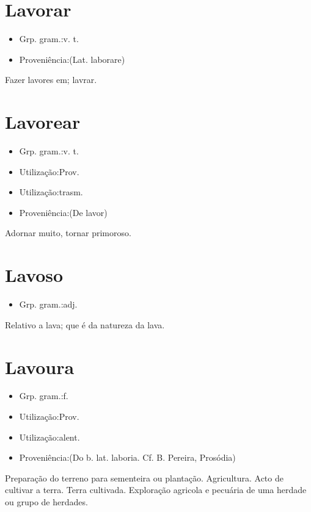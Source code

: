 \section{Lavorar}
\begin{itemize}
\item {Grp. gram.:v. t.}
\end{itemize}
\begin{itemize}
\item {Proveniência:(Lat. \textunderscore laborare\textunderscore )}
\end{itemize}
Fazer lavores em; lavrar.
\section{Lavorear}
\begin{itemize}
\item {Grp. gram.:v. t.}
\end{itemize}
\begin{itemize}
\item {Utilização:Prov.}
\end{itemize}
\begin{itemize}
\item {Utilização:trasm.}
\end{itemize}
\begin{itemize}
\item {Proveniência:(De \textunderscore lavor\textunderscore )}
\end{itemize}
Adornar muito, tornar primoroso.
\section{Lavoso}
\begin{itemize}
\item {Grp. gram.:adj.}
\end{itemize}
Relativo a lava; que é da natureza da lava.
\section{Lavoura}
\begin{itemize}
\item {Grp. gram.:f.}
\end{itemize}
\begin{itemize}
\item {Utilização:Prov.}
\end{itemize}
\begin{itemize}
\item {Utilização:alent.}
\end{itemize}
\begin{itemize}
\item {Proveniência:(Do b. lat. \textunderscore laboria\textunderscore . Cf. B. Pereira, \textunderscore Prosódia\textunderscore )}
\end{itemize}
Preparação do terreno para sementeira ou plantação.
Agricultura.
Acto de cultivar a terra.
Terra cultivada.
Exploração agricola e pecuária de uma herdade ou grupo de herdades.

